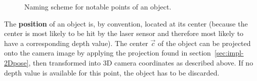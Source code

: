 \begin{figure}[H]
  \centering
  \caption{Naming scheme for notable points of an object.}
  \label{fig:image-points}
\end{figure}

The \textbf{position} of an object is, by convention, located at its center (because the center is most likely to be hit by the laser sensor and therefore most likely to have a corresponding depth value). The center $\overrightarrow{c}$ of the object can be projected onto the camera image by applying the projection found in section~\ref{sec:impl-2Dpose}, then transformed into 3D camera coordinates as described above. If no depth value is available for this point, the object has to be discarded. \\

